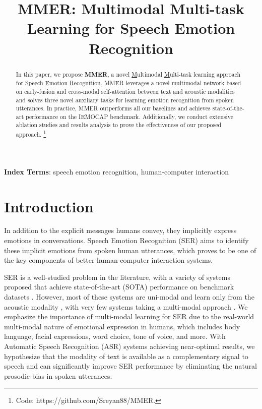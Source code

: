 \documentclass{INTERSPEECH2023}
\title{MMER: Multimodal Multi-task Learning for Speech Emotion Recognition}
\begin{document}
\maketitle
 
\begin{abstract}
In this paper, we propose \textbf{MMER}, a novel \underline{M}ultimodal  \underline{M}ulti-task learning approach for Speech \underline{E}motion \underline{R}ecognition. MMER leverages a novel multimodal network based on early-fusion and cross-modal self-attention between text and acoustic modalities and solves three novel auxiliary tasks for learning emotion recognition from spoken utterances. In practice, MMER outperforms all our baselines and achieves state-of-the-art performance on the IEMOCAP benchmark. Additionally, we conduct extensive ablation studies and results analysis to prove the effectiveness of our proposed approach. \footnote{Code: https://github.com/Sreyan88/MMER.}
\end{abstract}
\noindent\textbf{Index Terms}: speech emotion recognition, human-computer interaction





\section{Introduction}

In addition to the explicit messages humans convey, they implicitly express emotions in conversations. Speech Emotion Recognition (SER) aims to identify these implicit emotions from spoken human utterances, which proves to be one of the key components of better human-computer interaction systems. 



SER is a well-studied problem in the literature, with a variety of systems proposed that achieve state-of-the-art (SOTA) performance on benchmark datasets \cite{cai2021speech,morais_self,padi2022multimodal,baevski2020wav2vec}. However, most of these systems are uni-modal and learn only from the acoustic modality \cite{wuetal,sajjadetal,luetal1}, with very few systems taking a multi-modal approach \cite{padi2022multimodal,9688036}. We emphasize the importance of multi-modal learning for SER due to the real-world multi-modal nature of emotional expression in humans, which includes body language, facial expressions, word choice, tone of voice, and more. With Automatic Speech Recognition (ASR) systems achieving near-optimal results, we hypothesize that the modality of text is available as a complementary signal to speech and can significantly improve SER performance by eliminating the natural prosodic bias in spoken utterances.
\end{document}

